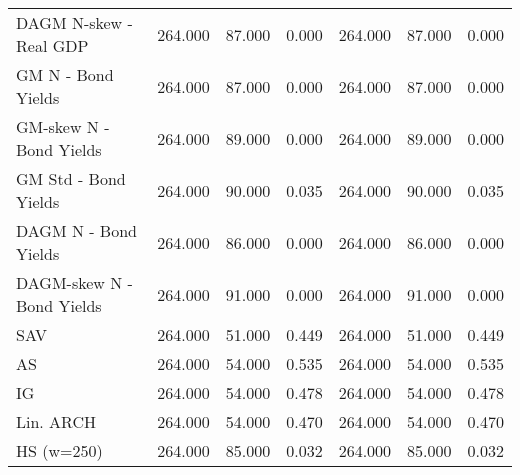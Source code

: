 \documentclass{article}
\begin{document}
\begin{table}[ht]
\begin{tabular}{|l|lll|lll|}
DAGM N-skew - Real GDP & 264.000 & 87.000 & 0.000  & 264.000 & 87.000 & 0.000 \\
GM N - Bond Yields & 264.000 & 87.000 & 0.000  & 264.000 & 87.000 & 0.000 \\ 
GM-skew N - Bond Yields & 264.000 & 89.000 & 0.000  & 264.000 & 89.000 & 0.000 \\
GM Std - Bond Yields & 264.000 & 90.000 & 0.035  & 264.000 & 90.000 & 0.035 \\
DAGM N - Bond Yields & 264.000 & 86.000 & 0.000  & 264.000 & 86.000 & 0.000 \\
DAGM-skew N - Bond Yields & 264.000 & 91.000 & 0.000 & 264.000 & 91.000 & 0.000 \\
\hline
SAV & 264.000 & 51.000 & 0.449  & 264.000 & 51.000 & 0.449 \\
AS & 264.000 & 54.000 & 0.535  & 264.000 & 54.000 & 0.535 \\ 
IG & 264.000 & 54.000 & 0.478 & 264.000 & 54.000 & 0.478 \\ 
Lin. ARCH & 264.000 & 54.000 & 0.470 & 264.000 & 54.000 & 0.470 \\ 
\hline
HS (w=250) & 264.000 & 85.000 & 0.032  & 264.000 & 85.000 & 0.032 \\ 
\hline
\end{tabular}
\end{table}
\end{document}
